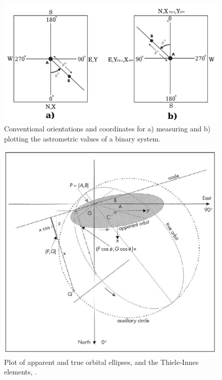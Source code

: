 \documentclass[12pt,preprint]{aastex}
\begin{document}
\begin{figure}[h]
\begin{center}
\includegraphics[scale=1.3]{Figures/Argyle-Observation-and-plot-conventions.jpg}
\caption[Measured and Plotted Atrometric data]{ Conventional orientations and coordinates for a) measuring and b) plotting the astrometric values of a binary system. }
\label{fig:5}
\end{center}
\end{figure}

\begin{figure}[h]
\begin{center}
\includegraphics[scale=1.5]{Figures/Argyle-oribit-plots2-cropped2.jpg}
\caption[Apparent and True orbital ellipses]{ Plot of apparent and true orbital ellipses, and the Thiele-Innes elements, \citet{Argyle}. }
\label{fig:apparentTrueEllipses}
\end{center}
\end{figure}
\end{document}
